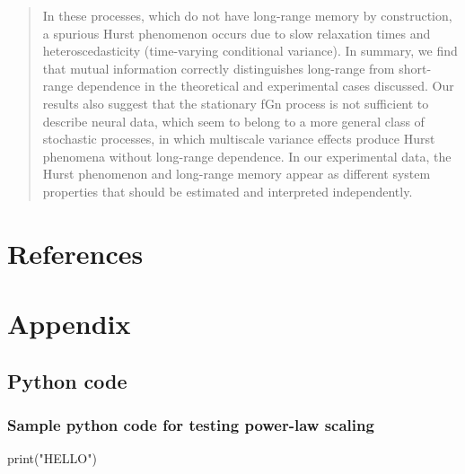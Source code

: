 \documentclass[
  sn-vancouver,
  Numbered,
  referee,
  lineno]{sn-jnl}
\newenvironment{Shaded}{\begin{snugshade}}{\end{snugshade}}
\newcommand{\BuiltInTok}[1]{\textcolor[rgb]{0.00,0.23,0.31}{#1}}
\newcommand{\NormalTok}[1]{\textcolor[rgb]{0.00,0.23,0.31}{#1}}
\newcommand{\StringTok}[1]{\textcolor[rgb]{0.13,0.47,0.30}{#1}}
\begin{document}
\begin{quote}
In these processes, which do not have long-range memory by construction,
a spurious Hurst phenomenon occurs due to slow relaxation times and
heteroscedasticity (time-varying conditional variance). In summary, we
find that mutual information correctly distinguishes long-range from
short-range dependence in the theoretical and experimental cases
discussed. Our results also suggest that the stationary fGn process is
not sufficient to describe neural data, which seem to belong to a more
general class of stochastic processes, in which multiscale variance
effects produce Hurst phenomena without long-range dependence. In our
experimental data, the Hurst phenomenon and long-range memory appear as
different system properties that should be estimated and interpreted
independently.
\end{quote}

\newpage{}

\section{References}\label{references-2}


\newpage{}

\section{Appendix}\label{appendix-2}

\subsection{Python code}\label{python-code-2}

\subsubsection{Sample python code for testing power-law
scaling}\label{sec-powerlawscalingcode}

\begin{Shaded}
\begin{Highlighting}[]
\BuiltInTok{print}\NormalTok{(}\StringTok{"HELLO"}\NormalTok{)}
\end{Highlighting}
\end{Shaded}
\end{document}
